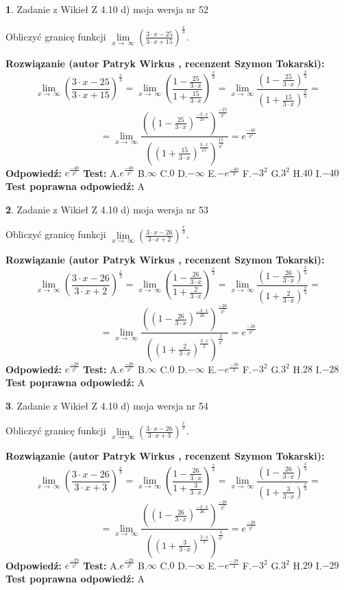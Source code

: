 \documentclass[12pt, a4paper]{article}
\theoremstyle{definition} %
\newtheorem{zad}{}
\newcommand{\zadStart}[1]{\begin{zad}#1\newline}
\newcommand{\zadStop}{\end{zad}}
\newcommand{\rozwStart}[2]{\noindent \textbf{Rozwiązanie (autor #1 , recenzent #2): }\newline}
\newcommand{\rozwStop}{\newline}
\newcommand{\odpStart}{\noindent \textbf{Odpowiedź:}\newline}
\newcommand{\odpStop}{\newline}
\newcommand{\testStart}{\noindent \textbf{Test:}\newline}
\newcommand{\testStop}{\newline}
\newcommand{\kluczStart}{\noindent \textbf{Test poprawna odpowiedź:}\newline}
\newcommand{\kluczStop}{\newline}
\begin{document}
\zadStart{Zadanie z Wikieł Z 4.10 d) moja wersja nr 52}


Obliczyć granicę funkcji  $\lim\limits_{x\to\ \infty}(\frac{3\cdot x-25}{3\cdot x+15})^{\frac{x}{3}}$.
\zadStop
\rozwStart{Patryk Wirkus}{Szymon Tokarski}
$$\lim\limits_{x\to\ \infty}(\frac{3\cdot x-25}{3\cdot x+15})^{\frac{x}{3}} = \lim\limits_{x\to\ \infty}(\frac{1-\frac{25}{3\cdot x}}{1+\frac{15}{3\cdot x}})^{\frac{x}{3}}=\lim\limits_{x\to\ \infty}\frac{(1-\frac{25}{3\cdot x})^{\frac{x}{3}}}{(1+\frac{15}{3\cdot x})^{\frac{x}{3}}}=$$
$$=\lim\limits_{x\to\ \infty}\frac{((1-\frac{25}{3\cdot x})^{\frac{-3\cdot x}{25}})^{\frac{-25}{3^{2}}}}{((1+\frac{15}{3\cdot x})^{\frac{3\cdot x}{15}})^{\frac{15}{3^{2}}}}=e^{\frac{-40}{3^{2}}}$$
\rozwStop
\odpStart
$e^{\frac{-40}{3^{2}}}$
\odpStop
\testStart
A.$e^{\frac{-40}{3^{2}}}$ B.$\infty$ C.$0$ D.$-\infty$ E.$-e^{\frac{-40}{3}}$
F.$-3^{2}$ G.$3^{2}$
H.$40$
I.$-40$
\testStop
\kluczStart
A
\kluczStop



\zadStart{Zadanie z Wikieł Z 4.10 d) moja wersja nr 53}


Obliczyć granicę funkcji  $\lim\limits_{x\to\ \infty}(\frac{3\cdot x-26}{3\cdot x+2})^{\frac{x}{3}}$.
\zadStop
\rozwStart{Patryk Wirkus}{Szymon Tokarski}
$$\lim\limits_{x\to\ \infty}(\frac{3\cdot x-26}{3\cdot x+2})^{\frac{x}{3}} = \lim\limits_{x\to\ \infty}(\frac{1-\frac{26}{3\cdot x}}{1+\frac{2}{3\cdot x}})^{\frac{x}{3}}=\lim\limits_{x\to\ \infty}\frac{(1-\frac{26}{3\cdot x})^{\frac{x}{3}}}{(1+\frac{2}{3\cdot x})^{\frac{x}{3}}}=$$
$$=\lim\limits_{x\to\ \infty}\frac{((1-\frac{26}{3\cdot x})^{\frac{-3\cdot x}{26}})^{\frac{-26}{3^{2}}}}{((1+\frac{2}{3\cdot x})^{\frac{3\cdot x}{2}})^{\frac{2}{3^{2}}}}=e^{\frac{-28}{3^{2}}}$$
\rozwStop
\odpStart
$e^{\frac{-28}{3^{2}}}$
\odpStop
\testStart
A.$e^{\frac{-28}{3^{2}}}$ B.$\infty$ C.$0$ D.$-\infty$ E.$-e^{\frac{-28}{3}}$
F.$-3^{2}$ G.$3^{2}$
H.$28$
I.$-28$
\testStop
\kluczStart
A
\kluczStop



\zadStart{Zadanie z Wikieł Z 4.10 d) moja wersja nr 54}


Obliczyć granicę funkcji  $\lim\limits_{x\to\ \infty}(\frac{3\cdot x-26}{3\cdot x+3})^{\frac{x}{3}}$.
\zadStop
\rozwStart{Patryk Wirkus}{Szymon Tokarski}
$$\lim\limits_{x\to\ \infty}(\frac{3\cdot x-26}{3\cdot x+3})^{\frac{x}{3}} = \lim\limits_{x\to\ \infty}(\frac{1-\frac{26}{3\cdot x}}{1+\frac{3}{3\cdot x}})^{\frac{x}{3}}=\lim\limits_{x\to\ \infty}\frac{(1-\frac{26}{3\cdot x})^{\frac{x}{3}}}{(1+\frac{3}{3\cdot x})^{\frac{x}{3}}}=$$
$$=\lim\limits_{x\to\ \infty}\frac{((1-\frac{26}{3\cdot x})^{\frac{-3\cdot x}{26}})^{\frac{-26}{3^{2}}}}{((1+\frac{3}{3\cdot x})^{\frac{3\cdot x}{3}})^{\frac{3}{3^{2}}}}=e^{\frac{-29}{3^{2}}}$$
\rozwStop
\odpStart
$e^{\frac{-29}{3^{2}}}$
\odpStop
\testStart
A.$e^{\frac{-29}{3^{2}}}$ B.$\infty$ C.$0$ D.$-\infty$ E.$-e^{\frac{-29}{3}}$
F.$-3^{2}$ G.$3^{2}$
H.$29$
I.$-29$
\testStop
\kluczStart
A
\kluczStop
\end{document}
